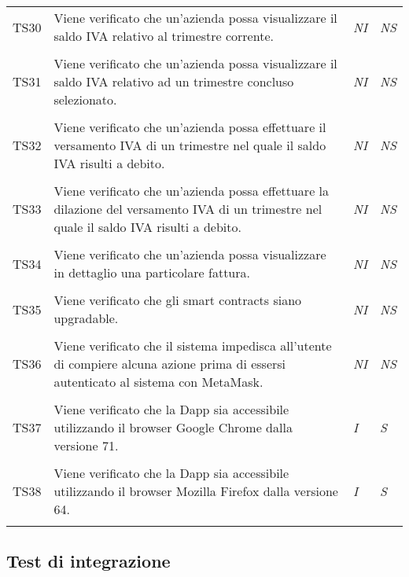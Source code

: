 \begin{longtable}{ >{\centering}p{} >{}p{}
			>{\centering}p{} >{\centering}p{}}
		\tabularnewline
		\hypertarget{TS30}{TS30} & Viene verificato che un'azienda possa 
		visualizzare il saldo IVA relativo al trimestre corrente. & 
		\textit{NI} & \textit{NS}\\ 

		\tabularnewline
		\hypertarget{TS31}{TS31} & Viene verificato che un'azienda possa 
		visualizzare il saldo IVA relativo ad un trimestre concluso selezionato. & 
		\textit{NI} & \textit{NS}\\ 

		\tabularnewline
		\hypertarget{TS32}{TS32} & Viene verificato che un'azienda possa 
		effettuare il versamento IVA di un trimestre nel quale il saldo IVA risulti a 
		debito. & \textit{NI} & \textit{NS}\\ 

		\tabularnewline
		\hypertarget{TS33}{TS33} & Viene verificato che un'azienda possa 
		effettuare la dilazione del versamento IVA di un trimestre nel quale il saldo 
		IVA risulti a debito. & \textit{NI} & \textit{NS}\\ 

		\tabularnewline
		\hypertarget{TS34}{TS34} & Viene verificato che un'azienda possa 
		visualizzare in dettaglio una particolare fattura. & \textit{NI} & \textit{NS}\\ 

		\tabularnewline
		\hypertarget{TS35}{TS35} & Viene verificato che gli smart contracts siano 
		upgradable. & \textit{NI} & \textit{NS}\\ 

		\tabularnewline
		\hypertarget{TS36}{TS36} & Viene verificato che il sistema impedisca 
		all'utente di compiere alcuna azione prima di essersi autenticato al sistema con 
		MetaMask. & \textit{NI} & \textit{NS}\\ 

		\tabularnewline
		\hypertarget{TS37}{TS37} & Viene verificato che la Dapp sia accessibile 
		utilizzando il browser Google Chrome dalla versione 71. & 
		\textit{I} & \textit{S}\\

		\tabularnewline
		\hypertarget{TS38}{TS38} & Viene verificato che la Dapp sia accessibile 
		utilizzando il browser Mozilla Firefox dalla versione 64. & \textit{I} 
		& \textit{S}\\  
		\tabularnewline
		\end{longtable}


\subsection{Test di integrazione}
	\renewcommand{\arraystretch}{1.5}
		
